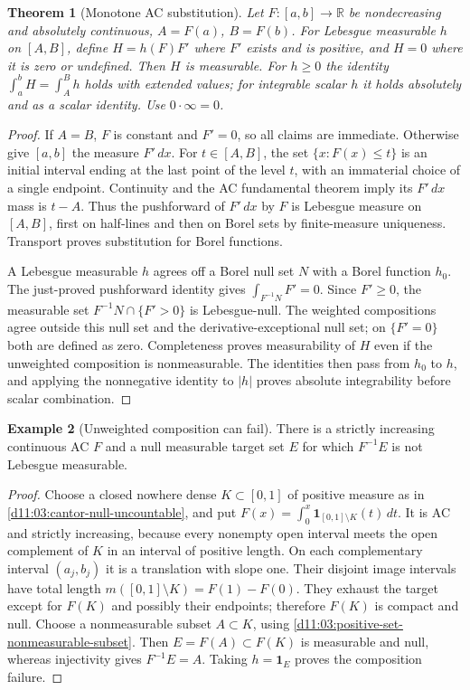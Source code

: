 \documentclass[11pt,oneside,openany]{book}
\newtheorem{theorem}{Theorem}[chapter]
\theoremstyle{definition}
\newtheorem{example}[theorem]{Example}
\theoremstyle{remark}
\newcommand{\R}{\mathbb R}\newcommand{\C}{\mathbb C}
\newcommand{\one}{\mathbf1}\newcommand{\ind}[1]{\mathbf1_{#1}}
\newcommand{\family}[1]{}
\begin{document}
\begin{theorem}[Monotone AC substitution]\family{D11.09.monotone_ac_substitution}\label{d11:09:monotone-ac-substitution}
Let $F:[a,b]\to\R$ be nondecreasing and absolutely continuous,
$A=F(a)$, $B=F(b)$. For Lebesgue measurable $h$ on $[A,B]$, define
$H=h(F)F'$ where $F'$ exists and is positive, and $H=0$ where it is zero
or undefined. Then $H$ is measurable. For $h\geq0$ the identity
$\int_a^bH=\int_A^Bh$ holds with extended values; for integrable scalar
$h$ it holds absolutely and as a scalar identity. Use $0\cdot\infty=0$.
\end{theorem}
\begin{proof}
If $A=B$, $F$ is constant and $F'=0$, so all claims are immediate.
Otherwise give $[a,b]$ the measure $F'\,dx$. For $t\in[A,B]$, the set
$\{x:F(x)\leq t\}$ is an initial interval ending at the last point of
the level $t$, with an immaterial choice of a single endpoint. Continuity
and the AC fundamental theorem imply its $F'\,dx$ mass is $t-A$.
Thus the pushforward of $F'\,dx$ by $F$ is Lebesgue measure on $[A,B]$,
first on half-lines and then on Borel sets by finite-measure uniqueness.
Transport proves substitution for Borel functions.

A Lebesgue measurable $h$ agrees off a Borel null set $N$ with a Borel
function $h_0$. The just-proved pushforward identity gives
$\int_{F^{-1}N}F'=0$. Since $F'\geq0$, the measurable set
$F^{-1}N\cap\{F'>0\}$ is Lebesgue-null. The weighted compositions agree
outside this null set and the derivative-exceptional null set; on
$\{F'=0\}$ both are defined as zero. Completeness proves measurability
of $H$ even if the unweighted composition is nonmeasurable. The identities
then pass from $h_0$ to $h$, and applying the nonnegative identity to
$|h|$ proves absolute integrability before scalar combination.
\end{proof}

\begin{example}[Unweighted composition can fail]\family{D11.09.composition_measurability_failure}\label{d11:09:composition-measurability-failure}
There is a strictly increasing continuous AC $F$ and a null measurable
target set $E$ for which $F^{-1}E$ is not Lebesgue measurable.
\end{example}
\begin{proof}
Choose a closed nowhere dense $K\subset[0,1]$ of positive measure
as in \cref{d11:03:cantor-null-uncountable}, and
put $F(x)=\int_0^x\one_{[0,1]\setminus K}(t)\,dt$. It is AC and
strictly increasing, because every nonempty open interval meets the open
complement of $K$ in an interval of positive length. On each complementary
interval $(a_j,b_j)$ it is a translation with slope one. Their disjoint
image intervals have total length $m([0,1]\setminus K)=F(1)-F(0)$.
They exhaust the target except for $F(K)$ and possibly their endpoints;
therefore $F(K)$ is compact and null. Choose a nonmeasurable subset
$A\subset K$, using \cref{d11:03:positive-set-nonmeasurable-subset}.
Then $E=F(A)\subset F(K)$ is measurable and null, whereas injectivity
gives $F^{-1}E=A$. Taking $h=\one_E$ proves the composition failure.
\end{proof}
\end{document}
